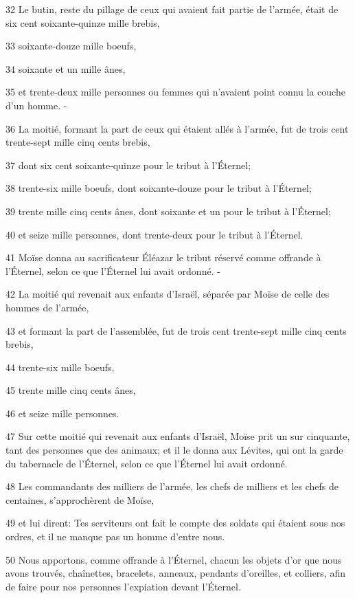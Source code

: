 \par 32 Le butin, reste du pillage de ceux qui avaient fait partie de l'armée, était de six cent soixante-quinze mille brebis,
\par 33 soixante-douze mille boeufs,
\par 34 soixante et un mille ânes,
\par 35 et trente-deux mille personnes ou femmes qui n'avaient point connu la couche d'un homme. -
\par 36 La moitié, formant la part de ceux qui étaient allés à l'armée, fut de trois cent trente-sept mille cinq cents brebis,
\par 37 dont six cent soixante-quinze pour le tribut à l'Éternel;
\par 38 trente-six mille boeufs, dont soixante-douze pour le tribut à l'Éternel;
\par 39 trente mille cinq cents ânes, dont soixante et un pour le tribut à l'Éternel;
\par 40 et seize mille personnes, dont trente-deux pour le tribut à l'Éternel.
\par 41 Moïse donna au sacrificateur Éléazar le tribut réservé comme offrande à l'Éternel, selon ce que l'Éternel lui avait ordonné. -
\par 42 La moitié qui revenait aux enfants d'Israël, séparée par Moïse de celle des hommes de l'armée,
\par 43 et formant la part de l'assemblée, fut de trois cent trente-sept mille cinq cents brebis,
\par 44 trente-six mille boeufs,
\par 45 trente mille cinq cents ânes,
\par 46 et seize mille personnes.
\par 47 Sur cette moitié qui revenait aux enfants d'Israël, Moïse prit un sur cinquante, tant des personnes que des animaux; et il le donna aux Lévites, qui ont la garde du tabernacle de l'Éternel, selon ce que l'Éternel lui avait ordonné.
\par 48 Les commandants des milliers de l'armée, les chefs de milliers et les chefs de centaines, s'approchèrent de Moïse,
\par 49 et lui dirent: Tes serviteurs ont fait le compte des soldats qui étaient sous nos ordres, et il ne manque pas un homme d'entre nous.
\par 50 Nous apportons, comme offrande à l'Éternel, chacun les objets d'or que nous avons trouvés, chaînettes, bracelets, anneaux, pendants d'oreilles, et colliers, afin de faire pour nos personnes l'expiation devant l'Éternel.
